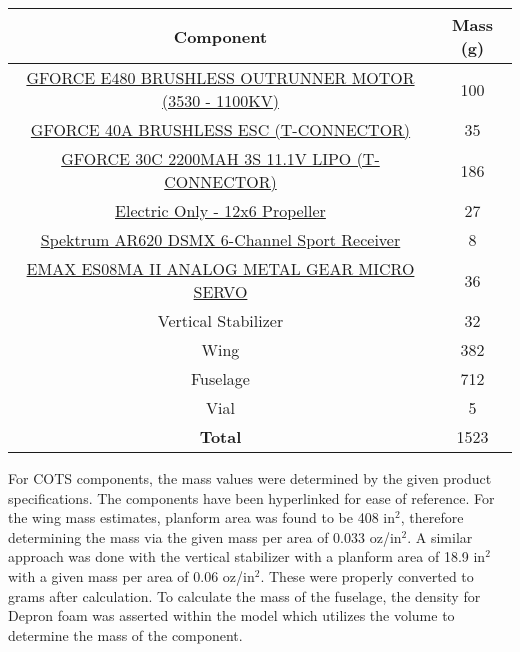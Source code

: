         \begin{table}[H]
        \begin{tabular}{|c|c| } %
            \hline \textbf{Component} & \textbf{Mass (g)} \\ \hline %
            \href{https://www.amazon.com/Brushless-Outrunner-Multicopters-Helicopter-Control/dp/B08MKQFSVF/ref=asc_df_B08MKQFSVF/?tag=hyprod-20&linkCode=df0&hvadid=475795164185&hvpos=&hvnetw=g&hvrand=9902342740412303481&hvpone=&hvptwo=&hvqmt=&hvdev=c&hvdvcmdl=&hvlocint=&hvlocphy=2840&hvtargid=pla-1195392311214&th=1}{GFORCE E480 BRUSHLESS OUTRUNNER MOTOR (3530 - 1100KV)} & 100 \\ \hline
            \href{http://www.valuehobby.com/gforce-40a-esc.html}{GFORCE 40A BRUSHLESS ESC (T-CONNECTOR)} & 35 \\ \hline
            \href{http://www.valuehobby.com/30c-2200mah-3s-t.html}{GFORCE 30C 2200MAH 3S 11.1V LIPO (T-CONNECTOR)} & 186 \\ \hline
            \href{https://www.masterairscrew.com/products/electric-only-12x6-propeller?currency=USD&utm_medium=cpc&utm_source=google&utm_campaign=Google\%20Shopping&gclid=CjwKCAiA9aKQBhBREiwAyGP5laqPgb8z2BGon5sD8qHYRZQVab7IcA0DZg8DOcFMsDTccBgRqirzgBoC1wkQAvD_BwE}{Electric Only - 12x6 Propeller} & 27 \\ \hline
            \href{https://www.horizonhobby.com/product/ar620-dsmx-6-channel-sport-receiver/SPMAR620.html?gclid=CjwKCAiA9aKQBhBREiwAyGP5lX6-hyQKl87DI0WH0pgWG2HS0woZKcd-L2bMRS_qWmVI1fLqpeCX0BoCrRAQAvD_BwE}{Spektrum AR620 DSMX 6-Channel Sport Receiver} & 8 \\ \hline
            \href{https://arrishobby.com/emax-es08ma-ii-12g-mini-metal-gear-analog-servo-p0842.html?VariantsId=12700}{EMAX ES08MA II ANALOG METAL GEAR MICRO SERVO} & 36 \\ \hline
            Vertical Stabilizer  & 32 \\ \hline
            Wing & 382 \\ \hline
            Fuselage & 712 \\ \hline
            Vial & 5 \\ \hline
            \textbf{Total} & 1523 \\ \hline
        \end{tabular}
        \end{table}
        
        For COTS components, the mass values were determined by the given product specifications. The components have been hyperlinked for ease of reference. For the wing mass estimates, planform area was found to be 408 in$^2$, therefore determining the mass via the given mass per area of 0.033 oz/in$^2$. A similar approach was done with the vertical stabilizer with a planform area of 18.9 in$^2$ with a given mass per area of 0.06 oz/in$^2$. These were properly converted to grams after calculation. To calculate the mass of the fuselage, the density for Depron foam was asserted within the model which utilizes the volume to determine the mass of the component.
        
